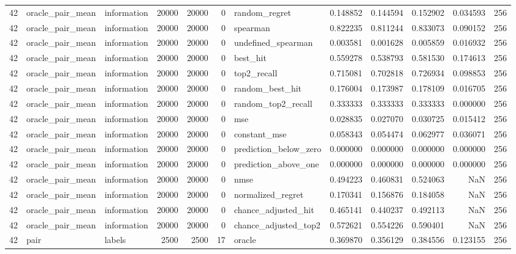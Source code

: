 \begin{tabular}{rllrrrlrrrrr}
42 & oracle_pair_mean & information & 20000 & 20000 & 0 & random_regret & 0.148852 & 0.144594 & 0.152902 & 0.034593 & 256 \\
42 & oracle_pair_mean & information & 20000 & 20000 & 0 & spearman & 0.822235 & 0.811244 & 0.833073 & 0.090152 & 256 \\
42 & oracle_pair_mean & information & 20000 & 20000 & 0 & undefined_spearman & 0.003581 & 0.001628 & 0.005859 & 0.016932 & 256 \\
42 & oracle_pair_mean & information & 20000 & 20000 & 0 & best_hit & 0.559278 & 0.538793 & 0.581530 & 0.174613 & 256 \\
42 & oracle_pair_mean & information & 20000 & 20000 & 0 & top2_recall & 0.715081 & 0.702818 & 0.726934 & 0.098853 & 256 \\
42 & oracle_pair_mean & information & 20000 & 20000 & 0 & random_best_hit & 0.176004 & 0.173987 & 0.178109 & 0.016705 & 256 \\
42 & oracle_pair_mean & information & 20000 & 20000 & 0 & random_top2_recall & 0.333333 & 0.333333 & 0.333333 & 0.000000 & 256 \\
42 & oracle_pair_mean & information & 20000 & 20000 & 0 & mse & 0.028835 & 0.027070 & 0.030725 & 0.015412 & 256 \\
42 & oracle_pair_mean & information & 20000 & 20000 & 0 & constant_mse & 0.058343 & 0.054474 & 0.062977 & 0.036071 & 256 \\
42 & oracle_pair_mean & information & 20000 & 20000 & 0 & prediction_below_zero & 0.000000 & 0.000000 & 0.000000 & 0.000000 & 256 \\
42 & oracle_pair_mean & information & 20000 & 20000 & 0 & prediction_above_one & 0.000000 & 0.000000 & 0.000000 & 0.000000 & 256 \\
42 & oracle_pair_mean & information & 20000 & 20000 & 0 & nmse & 0.494223 & 0.460831 & 0.524063 & NaN & 256 \\
42 & oracle_pair_mean & information & 20000 & 20000 & 0 & normalized_regret & 0.170341 & 0.156876 & 0.184058 & NaN & 256 \\
42 & oracle_pair_mean & information & 20000 & 20000 & 0 & chance_adjusted_hit & 0.465141 & 0.440237 & 0.492113 & NaN & 256 \\
42 & oracle_pair_mean & information & 20000 & 20000 & 0 & chance_adjusted_top2 & 0.572621 & 0.554226 & 0.590401 & NaN & 256 \\
42 & pair & labels & 2500 & 2500 & 17 & oracle & 0.369870 & 0.356129 & 0.384556 & 0.123155 & 256 \\

\end{tabular}
